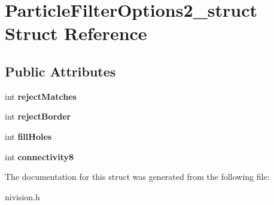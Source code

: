 \hypertarget{structParticleFilterOptions2__struct}{
\section{ParticleFilterOptions2\_\-struct Struct Reference}
\label{structParticleFilterOptions2__struct}
}
\subsection*{Public Attributes}
\begin{DoxyCompactItemize}
\item 
\hypertarget{structParticleFilterOptions2__struct_a7a004756eeb6af7e10968520b3f3c188}{
int {\bfseries rejectMatches}}
\label{structParticleFilterOptions2__struct_a7a004756eeb6af7e10968520b3f3c188}

\item 
\hypertarget{structParticleFilterOptions2__struct_a4978b24c71bce09bdb69fa5624611e0e}{
int {\bfseries rejectBorder}}
\label{structParticleFilterOptions2__struct_a4978b24c71bce09bdb69fa5624611e0e}

\item 
\hypertarget{structParticleFilterOptions2__struct_a86b5320628cdaf7759d1da9477e72284}{
int {\bfseries fillHoles}}
\label{structParticleFilterOptions2__struct_a86b5320628cdaf7759d1da9477e72284}

\item 
\hypertarget{structParticleFilterOptions2__struct_a8ad838f2fb729a028152f66eb1629277}{
int {\bfseries connectivity8}}
\label{structParticleFilterOptions2__struct_a8ad838f2fb729a028152f66eb1629277}

\end{DoxyCompactItemize}


The documentation for this struct was generated from the following file:\begin{DoxyCompactItemize}
\item 
nivision.h\end{DoxyCompactItemize}
